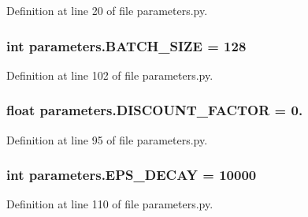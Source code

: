 Definition at line 20 of file parameters.\+py.

\subsubsection[{\texorpdfstring{B\+A\+T\+C\+H\+\_\+\+S\+I\+ZE}{BATCH_SIZE}}]{\setlength{\rightskip}{0pt plus 5cm}int parameters.\+B\+A\+T\+C\+H\+\_\+\+S\+I\+ZE = 128}\hypertarget{namespaceparameters_a2d37d9950f7a887014021ab455282af6}{}\label{namespaceparameters_a2d37d9950f7a887014021ab455282af6}


Definition at line 102 of file parameters.\+py.

\subsubsection[{\texorpdfstring{D\+I\+S\+C\+O\+U\+N\+T\+\_\+\+F\+A\+C\+T\+OR}{DISCOUNT_FACTOR}}]{\setlength{\rightskip}{0pt plus 5cm}float parameters.\+D\+I\+S\+C\+O\+U\+N\+T\+\_\+\+F\+A\+C\+T\+OR = 0.}\hypertarget{namespaceparameters_a70176024e0f585c846365800f1c7819c}{}\label{namespaceparameters_a70176024e0f585c846365800f1c7819c}


Definition at line 95 of file parameters.\+py.

\subsubsection[{\texorpdfstring{E\+P\+S\+\_\+\+D\+E\+C\+AY}{EPS_DECAY}}]{\setlength{\rightskip}{0pt plus 5cm}int parameters.\+E\+P\+S\+\_\+\+D\+E\+C\+AY = 10000}\hypertarget{namespaceparameters_ab9a88c663385563b35331bbea5c4a74b}{}\label{namespaceparameters_ab9a88c663385563b35331bbea5c4a74b}


Definition at line 110 of file parameters.\+py.

